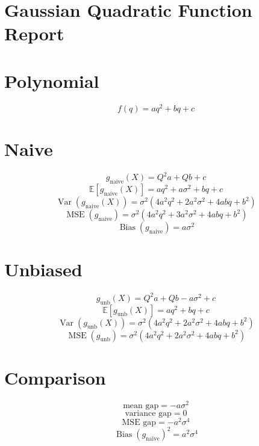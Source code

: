\documentclass{article}
\begin{document}
\section*{Gaussian Quadratic Function Report}
\section*{Polynomial}
\begin{dmath*}
f(q) = a q^{2} + b q + c
\end{dmath*}
\section*{Naive}
\begin{dmath*}
g_{\mathrm{naive}}(X) = Q^{2} a + Q b + c
\end{dmath*}
\begin{dmath*}
\mathbb{E}[g_{\mathrm{naive}}(X)] = a q^{2} + a \sigma^{2} + b q + c
\end{dmath*}
\begin{dmath*}
\operatorname{Var}(g_{\mathrm{naive}}(X)) = \sigma^{2} \left(4 a^{2} q^{2} + 2 a^{2} \sigma^{2} + 4 a b q + b^{2}\right)
\end{dmath*}
\begin{dmath*}
\operatorname{MSE}(g_{\mathrm{naive}}) = \sigma^{2} \left(4 a^{2} q^{2} + 3 a^{2} \sigma^{2} + 4 a b q + b^{2}\right)
\end{dmath*}
\begin{dmath*}
\operatorname{Bias}(g_{\mathrm{naive}}) = a \sigma^{2}
\end{dmath*}
\section*{Unbiased}
\begin{dmath*}
g_{\mathrm{unb}}(X) = Q^{2} a + Q b - a \sigma^{2} + c
\end{dmath*}
\begin{dmath*}
\mathbb{E}[g_{\mathrm{unb}}(X)] = a q^{2} + b q + c
\end{dmath*}
\begin{dmath*}
\operatorname{Var}(g_{\mathrm{unb}}(X)) = \sigma^{2} \left(4 a^{2} q^{2} + 2 a^{2} \sigma^{2} + 4 a b q + b^{2}\right)
\end{dmath*}
\begin{dmath*}
\operatorname{MSE}(g_{\mathrm{unb}}) = \sigma^{2} \left(4 a^{2} q^{2} + 2 a^{2} \sigma^{2} + 4 a b q + b^{2}\right)
\end{dmath*}
\section*{Comparison}
\begin{dmath*}
\text{mean gap} = - a \sigma^{2}
\end{dmath*}
\begin{dmath*}
\text{variance gap} = 0
\end{dmath*}
\begin{dmath*}
\text{MSE gap} = - a^{2} \sigma^{4}
\end{dmath*}
\begin{dmath*}
\operatorname{Bias}(g_{\mathrm{naive}})^2 = a^{2} \sigma^{4}
\end{dmath*}
\end{document}
